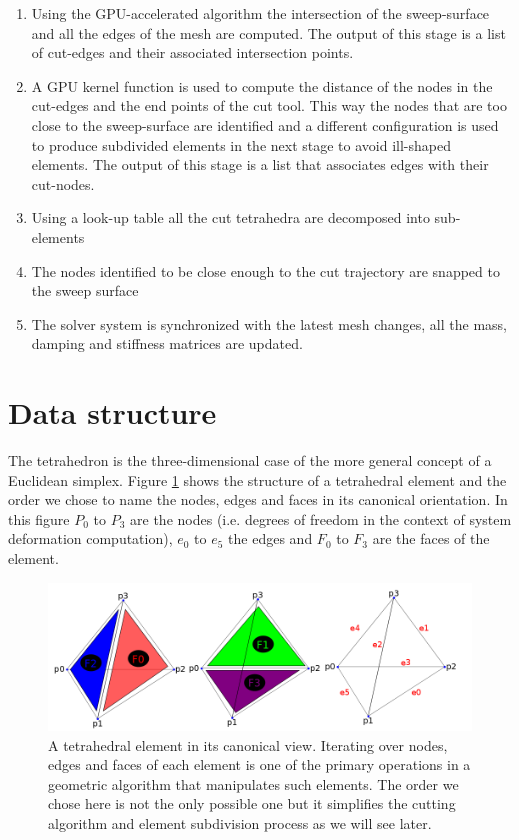 \begin{enumerate}
 \item Using the GPU-accelerated algorithm the intersection of the sweep-surface and all the edges of the mesh 
 are computed. The output of this stage is a list of cut-edges and their associated intersection points. 
 
 \item A GPU kernel function is used to compute the distance of the nodes in the cut-edges and the end points of 
 the cut tool. This way the nodes that are too close to the sweep-surface are identified and a different configuration 
 is used to produce subdivided elements in the next stage to avoid ill-shaped elements. The output of this stage is 
 a list that associates edges with their cut-nodes.
 
 \item Using a look-up table all the cut tetrahedra are decomposed into sub-elements
 
 \item The nodes identified to be close enough to the cut trajectory are snapped to the sweep surface
 
 \item The solver system is synchronized with the latest mesh changes, all the mass, damping and stiffness 
 matrices are updated.
\end{enumerate}


\section{Data structure}
The tetrahedron is the three-dimensional case of the more general concept of a Euclidean simplex. 
Figure \ref{fig:tetconfig3} shows the structure of a tetrahedral element and the order we chose to 
name the nodes, edges and faces in its canonical orientation. In this figure $P_0$ to $P_3$ are
the nodes (i.e. degrees of freedom in the context of system deformation computation), $e_0$ to $e_5$ the edges 
and $F_0$ to $F_3$ are the faces of the element.

\begin{figure}[H]
  \centering
  \includegraphics[width=1.0\linewidth]{figures/cutting/tetconfig3.png}
  \caption{\label{fig:tetconfig3}
  {A tetrahedral element in its canonical view. Iterating over nodes, edges and faces of each element is
  one of the primary operations in a geometric algorithm that manipulates such elements. The order we chose here is not the
  only possible one but it simplifies the cutting algorithm and element subdivision process as we will see later.}
}
\end{figure}


